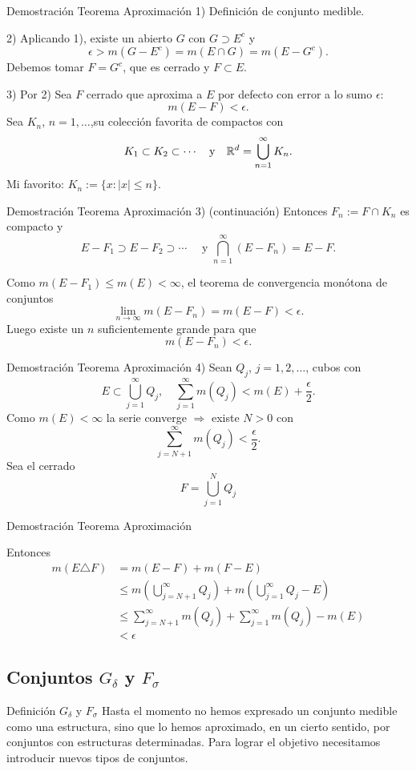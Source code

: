     
  
  



Demostración Teorema Aproximación
1) Definición de conjunto medible.

2) Aplicando 1), existe un abierto $G$ con  $G\supset E^c$ y 
\[\epsilon>m(G-E^c)=m(E\cap G)=m(E-G^c).\]
Debemos tomar $F=G^c$, que es cerrado y $F\subset E$.

3) Por 2)  Sea $F$ cerrado que aproxima a $E$ por defecto con error a lo sumo $\epsilon$:
\[m(E-F)<\epsilon.\]
Sea $K_n$, $n=1,\ldots$,su colección favorita de compactos con 
\[K_1\subset K_2\subset\cdots \quad\text{y}\quad \mathbb{R}^d=\bigcup_{n=1}^{\infty}K_n.
\]
Mi favorito: $K_n:=\{x:|x|\leq n\}$. 


Demostración Teorema Aproximación
3) (continuación) Entonces $F_n:=F\cap K_n$ es compacto y
\[E-F_1\supset E-F_2\supset\cdots\quad\text{ y } \bigcap_{n=1}^{\infty}(E-F_n)=E-F.\]

Como $m(E-F_1)\leq m(E)<\infty$, el teorema de convergencia monótona de conjuntos 
\[\lim_{n\to\infty}m(E-F_n)=m(E-F)<\epsilon.\]
Luego existe un $n$ suficientemente grande para que 
\[m(E-F_n)<\epsilon.\]



Demostración Teorema Aproximación
4) Sean $Q_j$, $j=1,2,\ldots$, cubos con 
\[E\subset\bigcup_{j=1}^{\infty}Q_j,\quad \sum_{j=1}^{\infty}m(Q_j)<m(E)+\frac{\epsilon}{2}.\]
Como $m(E)<\infty$ la serie converge $\Rightarrow$ existe $N>0$ con 
\[\sum_{j=N+1}^{\infty}m(Q_j)<\frac{\epsilon}{2}.\]
Sea el cerrado
\[F=\bigcup_{j=1}^{N}Q_j\]



Demostración Teorema Aproximación

Entonces
\[
 \begin{split}
  m(E\triangle F)&=m(E-F)+m(F-E)\\
		 &\leq m\left(\bigcup_{j=N+1}^{\infty}Q_j\right)+m\left(\bigcup_{j=1}^{\infty}Q_j-E\right)\\
		 &\leq\sum_{j=N+1}^{\infty}m(Q_j)+\sum_{j=1}^{\infty}m(Q_j)-m(E)\\
		 &<\epsilon
 \end{split}
\]



\subsection{Conjuntos $G_{\delta}$ y $F_{\sigma}$}
Definición $G_{\delta}$ y $F_{\sigma}$
Hasta el momento no hemos expresado un conjunto medible como una 
estructura, sino que lo hemos aproximado, en un cierto sentido, por conjuntos 
con  estructuras determinadas. Para lograr el objetivo necesitamos introducir 
nuevos tipos de conjuntos.

